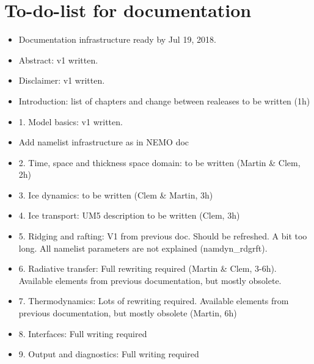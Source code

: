 \documentclass[../../tex_main/NEMO_manual]{subfiles}
\begin{document}

\chapter*{To-do-list for documentation}
\label{chap:TDL}

\begin{itemize}

\item Documentation infrastructure ready by Jul 19, 2018.

\item Abstract: v1 written.

\item Disclaimer: v1 written.

\item Introduction: list of chapters and change between realeases to be written (1h)

\item 1. Model basics: v1 written.

\item Add namelist infrastructure as in NEMO doc

\item 2. Time, space and thickness space domain: to be written (Martin \& Clem, 2h)

\item 3. Ice dynamics: to be written (Clem \& Martin, 3h)

\item 4. Ice transport: UM5 description to be written (Clem, 3h)

\item 5. Ridging and rafting: V1 from previous doc. Should be refreshed. A bit too long. All namelist parameters are not explained (namdyn\_rdgrft).

\item 6. Radiative transfer: Full rewriting required (Martin \& Clem, 3-6h). Available elements from previous documentation, but mostly obsolete.

\item 7. Thermodynamics: Lots of rewriting required. Available elements from previous documentation, but mostly obsolete (Martin, 6h)

\item 8. Interfaces: Full writing required 

\item 9. Output and diagnostics: Full writing required


\end{itemize}
\end{document}
